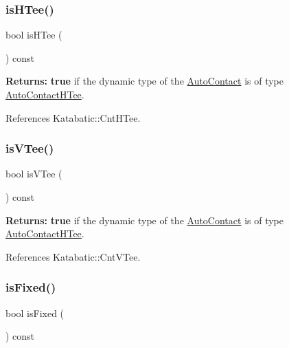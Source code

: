 \subsubsection{\texorpdfstring{is\+H\+Tee()}{isHTee()}}
{\footnotesize\ttfamily bool is\+H\+Tee (\begin{DoxyParamCaption}{ }\end{DoxyParamCaption}) const\hspace{0.3cm}{\ttfamily [inline]}}

{\bfseries Returns\+:} {\bfseries true} if the dynamic type of the \mbox{\hyperlink{classKatabatic_1_1AutoContact}{Auto\+Contact}} is of type \mbox{\hyperlink{classKatabatic_1_1AutoContactHTee}{Auto\+Contact\+H\+Tee}}. 

References Katabatic\+::\+Cnt\+H\+Tee.

\mbox{\label{classKatabatic_1_1AutoContact_ae38846b6213cccbc6f008b175b4604b0}} 
\subsubsection{\texorpdfstring{is\+V\+Tee()}{isVTee()}}
{\footnotesize\ttfamily bool is\+V\+Tee (\begin{DoxyParamCaption}{ }\end{DoxyParamCaption}) const\hspace{0.3cm}{\ttfamily [inline]}}

{\bfseries Returns\+:} {\bfseries true} if the dynamic type of the \mbox{\hyperlink{classKatabatic_1_1AutoContact}{Auto\+Contact}} is of type \mbox{\hyperlink{classKatabatic_1_1AutoContactHTee}{Auto\+Contact\+H\+Tee}}. 

References Katabatic\+::\+Cnt\+V\+Tee.

\mbox{\label{classKatabatic_1_1AutoContact_afd7362b850709bed8b61c1aa22399f97}} 
\subsubsection{\texorpdfstring{is\+Fixed()}{isFixed()}}
{\footnotesize\ttfamily bool is\+Fixed (\begin{DoxyParamCaption}{ }\end{DoxyParamCaption}) const\hspace{0.3cm}{\ttfamily [inline]}}

